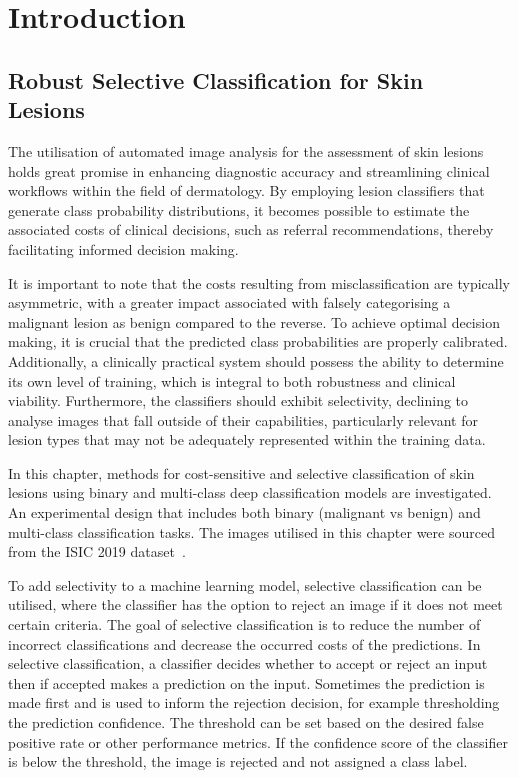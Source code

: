 \section{Introduction}
\label{sec:selective_introduction}
\subsection{Robust Selective Classification for Skin\\Lesions}
\label{subsec:robust and selective}
The utilisation of automated image analysis for the assessment of skin lesions holds great promise in enhancing diagnostic accuracy and streamlining clinical workflows within the field of dermatology. By employing lesion classifiers that generate class probability distributions, it becomes possible to estimate the associated costs of clinical decisions, such as referral recommendations, thereby facilitating informed decision making.

It is important to note that the costs resulting from misclassification are typically asymmetric, with a greater impact associated with falsely categorising a malignant lesion as benign compared to the reverse. To achieve optimal decision making, it is crucial that the predicted class probabilities are properly calibrated. Additionally, a clinically practical system should possess the ability to determine its own level of training, which is integral to both robustness and clinical viability. Furthermore, the classifiers should exhibit selectivity, declining to analyse images that fall outside of their capabilities, particularly relevant for lesion types that may not be adequately represented within the training data.

In this chapter, methods for cost-sensitive and selective classification of skin lesions using binary and multi-class deep classification models are investigated. An experimental design that includes both binary (malignant vs benign) and multi-class classification tasks. The images utilised in this chapter were sourced from the ISIC 2019 dataset~\citep{codella2018skin,combalia2019bcn20000,tschandl2018ham10000}.

To add selectivity to a machine learning model, selective classification can be utilised, where the classifier has the option to reject an image if it does not meet certain criteria. The goal of selective classification is to reduce the number of incorrect classifications and decrease the occurred costs of the predictions. In selective classification, a classifier decides whether to accept or reject an input then if accepted makes a prediction on the input. Sometimes the prediction is made first and is used to inform the rejection decision, for example thresholding the prediction confidence. The threshold can be set based on the desired false positive rate or other performance metrics. If the confidence score of the classifier is below the threshold, the image is rejected and not assigned a class label.

